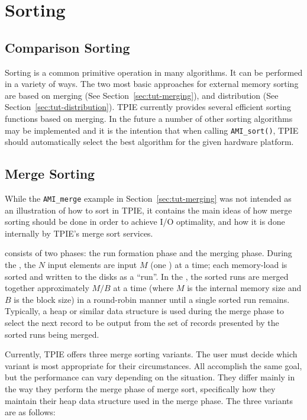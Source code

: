 \section{Sorting}
\label{sec:tut-sorting}
\subsection{Comparison Sorting} 

Sorting is a common primitive operation in many algorithms.
It can be performed in a variety of ways. The two most basic
approaches for external memory sorting are based on merging
(See Section~\ref{sec:tut-merging}), and distribution (See
Section~\ref{sec:tut-distribution}).
TPIE currently provides several efficient sorting functions
based on merging.  In the future a number of other sorting
algorithms may be implemented and it is the intention that
when calling \lstinline|AMI_sort()|, TPIE should automatically
select the best algorithm for the given hardware platform.

\subsection{Merge Sorting} 
While the \lstinline|AMI_merge| example in
Section~\ref{sec:tut-merging} was not intended as an
illustration of how to sort in TPIE, it contains the main
ideas of how merge sorting should be done in order to
achieve I/O optimality, and how it is done internally by
TPIE's merge sort services.

\noindent
{} consists of two phases: the run formation
phase and the merging phase.  During the , the $N$ input elements are input $M$ (one )
at a time; each memory-load is sorted and written to the
disks as a ``run''.  In the , the sorted
runs are merged together approximately $M/B$ at a time (where $M$
is the internal memory size and $B$ is the block size) in a
round-robin manner until a single sorted run remains.
Typically, a heap or similar data structure is used during
the merge phase to select the next record to be output from
the set of records presented by the sorted runs being
merged. 

Currently, TPIE offers three merge sorting variants. The
user must decide which variant is most appropriate for their
circumstances.  All accomplish the same goal, but the
performance can vary depending on the situation. They differ
mainly in the way they perform the merge phase of merge
sort, specifically how they maintain their heap data
structure used in the merge phase. The three variants are as
follows:

